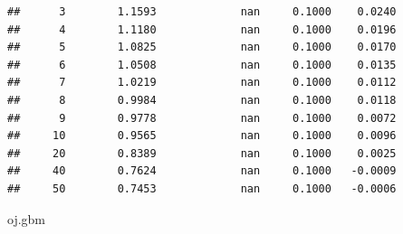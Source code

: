\documentclass[
]{book}
\newenvironment{Shaded}{\begin{snugshade}}{\end{snugshade}}
\newcommand{\NormalTok}[1]{#1}
\begin{document}
\begin{verbatim}
##      3        1.1593             nan     0.1000    0.0240
##      4        1.1180             nan     0.1000    0.0196
##      5        1.0825             nan     0.1000    0.0170
##      6        1.0508             nan     0.1000    0.0135
##      7        1.0219             nan     0.1000    0.0112
##      8        0.9984             nan     0.1000    0.0118
##      9        0.9778             nan     0.1000    0.0072
##     10        0.9565             nan     0.1000    0.0096
##     20        0.8389             nan     0.1000    0.0025
##     40        0.7624             nan     0.1000   -0.0009
##     50        0.7453             nan     0.1000   -0.0006
\end{verbatim}

\begin{Shaded}
\begin{Highlighting}[]
\NormalTok{oj.gbm}
\end{Highlighting}
\end{Shaded}
\end{document}
